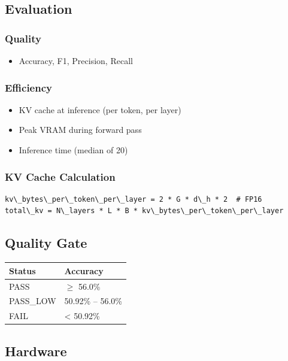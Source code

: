 \subsection{Evaluation}

\subsubsection{Quality}
\begin{itemize}
\item Accuracy, F1, Precision, Recall

\end{itemize}
\subsubsection{Efficiency}
\begin{itemize}
\item KV cache at inference (per token, per layer)
\item Peak VRAM during forward pass
\item Inference time (median of 20)

\end{itemize}
\subsubsection{KV Cache Calculation}

\begin{lstlisting}
kv\_bytes\_per\_token\_per\_layer = 2 * G * d\_h * 2  # FP16
total\_kv = N\_layers * L * B * kv\_bytes\_per\_token\_per\_layer
\end{lstlisting}

\subsection{Quality Gate}

\begin{table}[H]
\centering
\small
\begin{tabular}{ll}
\toprule
\textbf{Status} & \textbf{Accuracy} \\
\midrule
PASS & $\ge$ 56.0\% \\
PASS\_LOW & 50.92\% -- 56.0\% \\
FAIL & \textless{} 50.92\% \\
\bottomrule
\end{tabular}
\end{table}

\subsection{Hardware}

